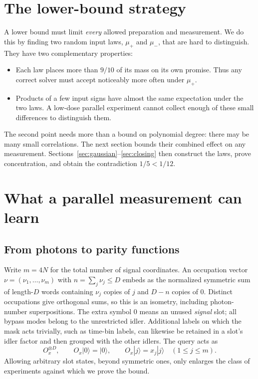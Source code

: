 \documentclass[11pt]{article}
\newcommand{\1}{\mathbf 1}
\begin{document}
\section{The lower-bound strategy}
A lower bound must limit \emph{every} allowed preparation and measurement.
We do this by finding two random input laws, $\mu_+$ and $\mu_-$, that
are hard to distinguish. They have two complementary properties:
\begin{itemize}
\item Each law places more than $9/10$ of its mass on its own promise.
Thus any correct solver must accept noticeably more often under $\mu_+$.
\item Products of a few input signs have almost the same expectation
under the two laws. A low-dose parallel experiment cannot collect enough
of these small differences to distinguish them.
\end{itemize}
The second point needs more than a bound on polynomial degree: there
may be many small correlations. The next section bounds their combined
effect on any measurement. Sections~\ref{sec:gaussian}--\ref{sec:closing}
then construct the laws, prove concentration, and obtain the contradiction
$1/5<1/12$.

\section{What a parallel measurement can learn}\label{sec:fourier}
\subsection{From photons to parity functions}
Write $m=4N$ for the total number of signal coordinates. An occupation
vector $\nu=(\nu_1,\ldots,\nu_m)$ with $n=\sum_j\nu_j\le D$ embeds
as the normalized symmetric sum of length-$D$ words containing $\nu_j$
copies of $j$ and $D-n$ copies of $0$. Distinct occupations give
orthogonal sums, so this is an isometry, including photon-number
superpositions. The extra symbol $0$ means an unused \emph{signal} slot;
all bypass modes belong to the unrestricted idler. Additional labels
on which the mask acts trivially, such as time-bin labels, can likewise
be retained in a slot's idler factor and then grouped with the other idlers.
The query acts as
\[
 O_x^{\otimes D},\qquad O_x|0\rangle=|0\rangle,\qquad
 O_x|j\rangle=x_j|j\rangle\quad(1\le j\le m).
\]
Allowing arbitrary slot states, beyond symmetric ones, only enlarges
the class of experiments against which we prove the bound.
\end{document}
